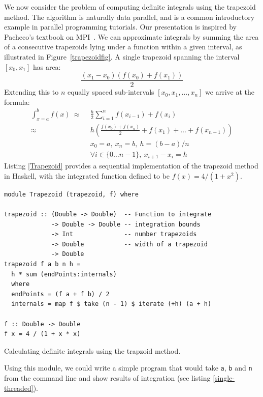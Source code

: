 \documentclass{tmr}
\begin{document}
We now consider the problem of computing definite integrals
using the trapezoid method. The algorithm is naturally data parallel, and is a common
introductory example in parallel programming tutorials. Our presentation is inspired by
Pacheco's textbook on MPI~\cite{Pacheco}.
We can approximate integrals by summing the area of a consecutive
trapezoids lying under a function within a given interval, as illustrated in
Figure~\ref{trapezoidfig}. A single trapezoid spanning the interval
$[x_0,x_1]$ has area:
\begin{equation*}
\frac{(x_1 - x_0)(f(x_0) + f(x_1))}{2}
\end{equation*}
Extending this to $n$ equally spaced sub-intervals $[x_0,x_1,\ldots,x_n]$ we arrive at the formula:
\begin{equation*}
\begin{split}
\int_{x=a}^{b} f(x)\ \approx\ &\ \frac{h}{2} \sum_{i=1}^n f(x_{i-1}) + f(x_i) \\[3mm]
                     \approx\ &\ h \left(\frac{f(x_0) + f(x_n)}{2} + f(x_1) + \ldots + f(x_{n-1})\right) \\[3mm]
                     &\ x_0 = a,\ x_n = b,\ h = (b - a)/n\\
                     &\ \forall i \in \{0 \ldots n-1\},\ x_{i+1} - x_{i} = h
\end{split}
\end{equation*}
Listing \ref{Trapezoid} provides a sequential implementation of the trapezoid method in Haskell, with
the integrated function defined to be $f(x) = 4 / (1 + x^2)$.

\begin{listing}
\begin{Verbatim}
module Trapezoid (trapezoid, f) where

trapezoid :: (Double -> Double)  -- Function to integrate
             -> Double -> Double -- integration bounds
             -> Int              -- number trapezoids
             -> Double           -- width of a trapezoid
             -> Double
trapezoid f a b n h =
  h * sum (endPoints:internals)
  where
  endPoints = (f a + f b) / 2
  internals = map f $ take (n - 1) $ iterate (+h) (a + h)

f :: Double -> Double
f x = 4 / (1 + x * x)
\end{Verbatim}
\caption{Calculating definite integrals using the trapzoid method. \label{Trapezoid}}
\end{listing}

Using this module, we could write a simple program that would take
\verb|a|, \verb|b| and \verb|n| from the command line and show results
of integration (see listing \ref{single-threaded}).
\end{document}
